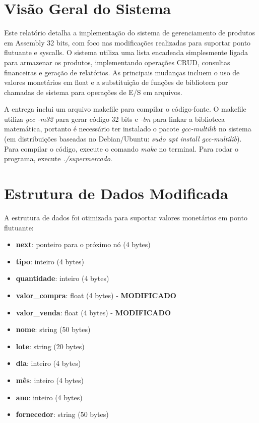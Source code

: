 \documentclass[12pt]{article}
\begin{document}


\tableofcontents
\newpage

\section{Visão Geral do Sistema}
Este relatório detalha a implementação do sistema de gerenciamento de produtos em Assembly 32 bits, com foco nas modificações realizadas para suportar ponto flutuante e syscalls. O sistema utiliza uma lista encadeada simplesmente ligada para armazenar os produtos, implementando operações CRUD, consultas financeiras e geração de relatórios. As principais mudanças incluem o uso de valores monetários em float e a substituição de funções de biblioteca por chamadas de sistema para operações de E/S em arquivos.

A entrega inclui um arquivo makefile para compilar o código-fonte. O makefile utiliza \textit{gcc -m32} para gerar código 32 bits e \textit{-lm} para linkar a biblioteca matemática, portanto é necessário ter instalado o pacote \textit{gcc-multilib} no sistema (em distribuições baseadas no Debian/Ubuntu: \textit{sudo apt install gcc-multilib}). Para compilar o código, execute o comando \textit{make} no terminal. Para rodar o programa, execute \textit{./supermercado}.

\section{Estrutura de Dados Modificada}
A estrutura de dados foi otimizada para suportar valores monetários em ponto flutuante:

\begin{itemize}
    \item \textbf{next}: ponteiro para o próximo nó (4 bytes)
    \item \textbf{tipo}: inteiro (4 bytes)
    \item \textbf{quantidade}: inteiro (4 bytes)
    \item \textbf{valor\_compra}: float (4 bytes) - \textbf{MODIFICADO}
    \item \textbf{valor\_venda}: float (4 bytes) - \textbf{MODIFICADO}
    \item \textbf{nome}: string (50 bytes)
    \item \textbf{lote}: string (20 bytes)
    \item \textbf{dia}: inteiro (4 bytes)
    \item \textbf{mês}: inteiro (4 bytes)
    \item \textbf{ano}: inteiro (4 bytes)
    \item \textbf{fornecedor}: string (50 bytes)
\end{itemize}
\end{document}
